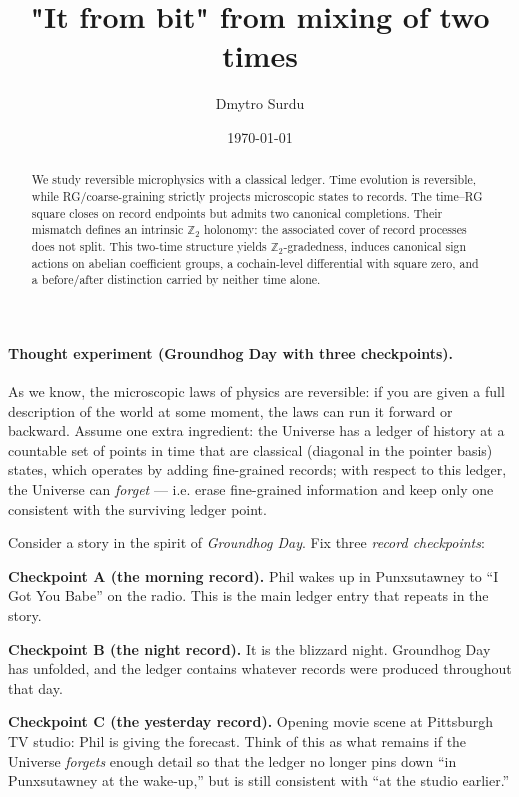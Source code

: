 \documentclass[aps,prl,reprint,floatfix]{revtex4-2}
\theoremstyle{plain}
\theoremstyle{definition}
\begin{document}
\title{"It from bit" from mixing of two times}
\author{Dmytro Surdu}
\date{\today}

\begin{abstract}
We study reversible microphysics with a classical ledger. Time evolution is reversible, while RG/coarse-graining strictly projects microscopic states to records. The time--RG square closes on record endpoints but admits two canonical completions. Their mismatch defines an intrinsic $\mathbb Z_2$ holonomy: the associated cover of record processes does not split. This two-time structure yields $\mathbb Z_2$-gradedness, induces canonical sign actions on abelian coefficient groups, a cochain-level differential with square zero, and a before/after distinction carried by neither time alone.
\end{abstract}
\maketitle

\paragraph{Thought experiment (Groundhog Day with three checkpoints).}
As we know, the microscopic laws of physics are reversible: if you are given a full
description of the world at some moment, the laws can run it forward or backward.
Assume one extra ingredient: the Universe has a ledger of history at a countable set of points in time that are classical (diagonal in the pointer basis) states, which operates by adding fine-grained records; with respect to this ledger, the Universe can \emph{forget} --- i.e. erase
fine-grained information and keep only one consistent with the surviving ledger point.

Consider a story in the spirit of \emph{Groundhog Day}. Fix three \emph{record checkpoints}:

\smallskip
\noindent\textbf{Checkpoint A (the morning record).}
Phil wakes up in Punxsutawney to ``I Got You Babe'' on the radio. This is the main ledger entry that repeats in the story.

\smallskip
\noindent\textbf{Checkpoint B (the night record).}
It is the blizzard night. Groundhog Day has unfolded, and the ledger contains whatever records were produced throughout that day.

\smallskip
\noindent\textbf{Checkpoint C (the yesterday record).}
Opening movie scene at Pittsburgh TV studio: Phil is giving the forecast. Think of this as what remains if the Universe \emph{forgets} enough detail so that the
ledger no longer pins down ``in Punxsutawney at the wake-up,'' but is still consistent with ``at the studio earlier.''
\end{document}
